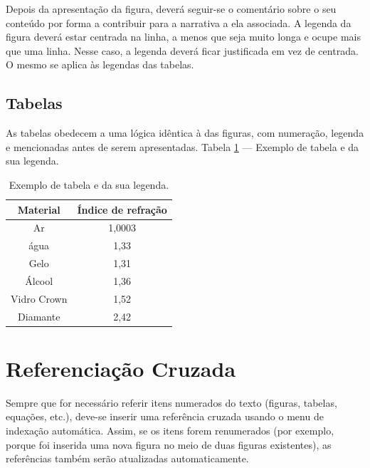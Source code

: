 \documentclass[a4paper,twoside,11pt]{report}
\makeatletter
\def\cleardoublepage{\clearpage\if@twoside \ifodd\c@page\else
    \hbox{}
    \vspace*{\fill}
    \vspace{\fill}
    \thispagestyle{empty}
    \newpage
    \if@twocolumn\hbox{}\newpage\fi\fi\fi}
\makeatother
\begin{document}
Depois da apresentação da figura, deverá seguir-se o comentário sobre o seu conteúdo por forma a contribuir para a narrativa a ela associada. A legenda da figura deverá estar centrada na linha, a menos que seja muito longa e ocupe mais que uma linha. Nesse caso, a legenda deverá ficar justificada em vez de centrada. O mesmo se aplica às legendas das tabelas.

\subsection{Tabelas}
As tabelas obedecem a uma lógica idêntica à das figuras, com numeração, legenda e mencionadas antes de serem apresentadas.
Tabela \ref{tab:my_label} — Exemplo de tabela e da sua legenda.


\begin{table}[tbp]
    \centering
    \caption{Exemplo de tabela e da sua legenda.}
    \begin{tabular}{|c|c|}
        \hline
        \textbf{Material} &	\textbf{Índice de refração} \\
        \hline
        Ar       & 	1,0003 \\
        água     &	1,33 \\
        Gelo     &	1,31 \\
        Álcool   &	1,36 \\
        Vidro Crown &	1,52 \\
        Diamante    &	2,42 \\
        \hline
    \end{tabular}
    \label{tab:my_label}
\end{table}


\section{Referenciação Cruzada}
Sempre que for necessário referir itens numerados do texto (figuras, tabelas, equações, etc.), deve-se inserir uma referência cruzada usando o menu de indexação automática. Assim, se os itens forem renumerados (por exemplo, porque foi inserida uma nova figura no meio de duas figuras existentes), as referências também serão atualizadas automaticamente.







\clearpage
\end{document}
